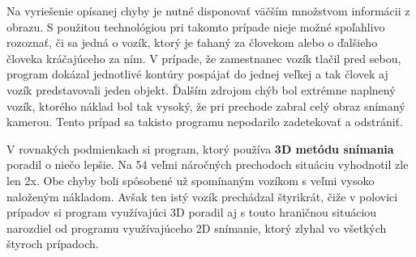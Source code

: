 Na vyriešenie opísanej chyby je nutné disponovať väčším množstvom informácii z obrazu. S použitou technológiou pri takomto prípade nieje možné spoľahlivo rozoznať, či sa jedná o vozík, ktorý je ťahaný za človekom alebo o ďalšieho človeka kráčajúceho za ním. V prípade, že zamestnanec vozík tlačil pred sebou, program dokázal jednotlivé kontúry pospájať do jednej veľkej a tak človek aj vozík predstavovali jeden objekt. Ďalším zdrojom chýb bol extrémne naplnený vozík, ktorého náklad bol tak vysoký, že pri prechode zabral celý obraz snímaný kamerou. Tento prípad sa takisto programu nepodarilo zadetekovať a odstrániť.

V rovnakých podmienkach si program, ktorý používa \textbf{3D metódu snímania} poradil o niečo lepšie. Na 54 veľmi náročných prechodoch situáciu vyhodnotil zle len 2x. Obe chyby boli spôsobené už spomínaným vozíkom s veľmi vysoko naloženým nákladom. Avšak ten istý vozík prechádzal štyrikrát, čiže v polovici prípadov si program využívajúci 3D poradil aj s touto hraničnou situáciou narozdiel od programu využívajúceho 2D snímanie, ktorý zlyhal vo všetkých štyroch prípadoch. 

